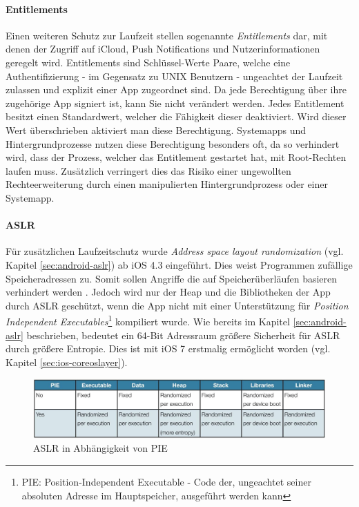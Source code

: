 		\paragraph{Entitlements}
			Einen weiteren Schutz zur Laufzeit stellen sogenannte \textsl{Entitlements}
			dar, mit denen der Zugriff auf iCloud, Push	Notifications und
			Nutzerinformationen geregelt wird. Entitlements sind Schlüssel-Werte Paare,
			welche eine	Authentifizierung - im Gegensatz zu UNIX Benutzern - ungeachtet
			der Laufzeit zulassen und explizit einer App zugeordnet sind. Da jede
			Berechtigung über ihre zugehörige App signiert ist, kann Sie nicht
			verändert werden. Jedes Entitlement besitzt einen Standardwert, welcher die
			Fähigkeit dieser deaktiviert. Wird dieser Wert überschrieben aktiviert man
			diese Berechtigung.	Systemapps und Hintergrundprozesse nutzen diese
			Berechtigung besonders oft, da so verhindert wird, dass der Prozess, welcher
			das Entitlement gestartet hat, mit Root-Rechten laufen muss.
			Zusätzlich verringert dies das Risiko einer ungewollten Rechteerweiterung
			durch einen manipulierten Hintergrundprozess oder einer Systemapp.
		
		\paragraph{ASLR}\label{sec:ios-aslr}
			Für zusätzlichen Laufzeitschutz wurde \textsl{Address space layout
			randomization} \cite[S. 1]{iOS4SecurityEvalutaion} (vgl. Kapitel
			\ref{sec:android-aslr}) ab iOS 4.3 eingeführt.
			Dies weist Programmen zufällige Speicheradressen zu. Somit sollen Angriffe die auf
			Speicherüberläufen basieren verhindert werden \cite[S. 131]{Levin2012}.
			Jedoch wird nur der Heap und die Bibliotheken der App durch
			ASLR geschützt, wenn die App nicht mit einer Unterstützung für
			\textsl{Position Independent Executables}\footnote{PIE: Position-Independent
			Executable - Code der, ungeachtet seiner absoluten Adresse im Hauptspeicher,
			ausgeführt werden kann} kompiliert wurde. Wie bereits im Kapitel
			\ref{sec:android-aslr} beschrieben, bedeutet ein 64-Bit Adressraum größere
			Sicherheit für ASLR durch größere Entropie. Dies ist mit iOS 7 erstmalig
			ermöglicht worden (vgl. Kapitel \ref{sec:ios-coreoslayer}).
			\begin{figure}[h]
				\centering
				\includegraphics[width=0.9\linewidth]{ios/media/aslr-pie.jpg}
				\caption{ASLR in Abhängigkeit von PIE
				\cite[S. 1]{iOS4SecurityEvalutaion}}
				\label{fig:aslr}
			\end{figure}
		
